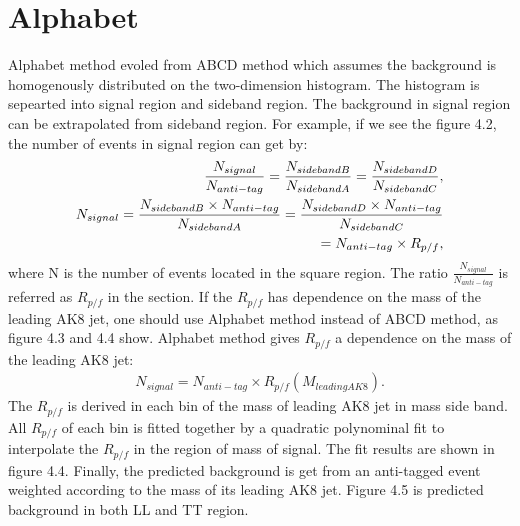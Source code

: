\section{Alphabet}
Alphabet method evoled from ABCD method which assumes the background is homogenously distributed on the two-dimension histogram. The histogram is sepearted into signal region and sideband region. The background in signal region can be extrapolated from sideband region. For example, if we see the figure 4.2, the number of events in signal region can get by:
\begin{equation} \label{eq1}
\centering
\begin{split}
\frac{N_{signal}}{N_{anti-tag}} = \frac{N_{side band B}}{N_{side band A}} = \frac{N_{side band D}}{N_{side band C}}, \\
N_{signal} = \frac{N_{side band B} \times N_{anti-tag}}{N_{side band A}} = \frac{N_{side band D} \times N_{anti-tag}}{N_{side band C}} \\
= N_{anti-tag} \times R_{p/f}, \\
\end{split}
\end{equation}
where N is the number of events located in the square region. The ratio $\frac{N_{signal}}{N_{anti-tag}}$ is referred as $R_{p/f}$ in the section. If the $R_{p/f}$ has dependence on the mass of the leading AK8 jet, one should use Alphabet method instead of ABCD method, as figure 4.3 and 4.4 show. Alphabet method gives $R_{p/f}$ a dependence on the mass of the leading AK8 jet:
\begin{equation} \label{eq2}
\begin{split}
N_{signal} = N_{anti-tag} \times R_{p/f} (M_{leading AK8}).
\end{split}
\end{equation}
The $R_{p/f}$ is derived in each bin of the mass of leading AK8 jet in mass side band. All $R_{p/f}$ of each bin is fitted together by a quadratic polynominal fit to interpolate the $R_{p/f}$ in the region of mass of signal. The fit results are shown in figure 4.4. Finally, the predicted background is get from an anti-tagged event weighted according to the mass of its leading AK8 jet. Figure 4.5 is predicted background in both LL and TT region. 

